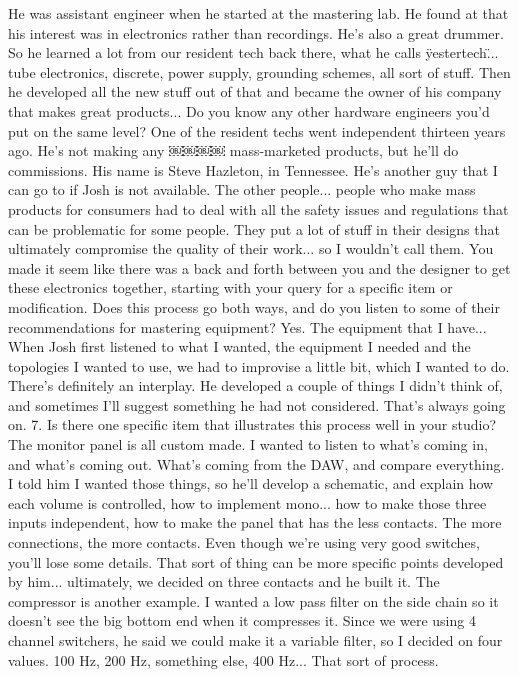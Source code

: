 He was assistant engineer when he started at the mastering lab. He found at that his interest was in electronics rather than recordings. He's also a great drummer. So he learned a lot from our resident tech back there, what he calls \"yestertech\"... tube electronics, discrete, power supply, grounding schemes, all sort of stuff. Then he developed all the new stuff out of that and became the owner of his company that makes great products...
Do you know any other hardware engineers you'd put on the same level?
One of the resident techs went independent thirteen years ago. He's not making any
￼￼￼￼
mass-marketed products, but he'll do commissions. His name is Steve Hazleton, in Tennessee. He's another guy that I can go to if Josh is not available. The other people... people who make mass products for consumers had to deal with all the safety issues and regulations that can be problematic for some people. They put a lot of stuff in their designs that ultimately compromise the quality of their work... so I wouldn't call them.
You made it seem like there was a back and forth between you and the designer to get these electronics together, starting with your query for a specific item or modification. Does this process go both ways, and do you listen to some of their recommendations for mastering equipment?
Yes. The equipment that I have... When Josh first listened to what I wanted, the equipment I needed and the topologies I wanted to use, we had to improvise a little bit, which I wanted to do. There's definitely an interplay. He developed a couple of things I didn't think of, and sometimes I'll suggest something he had not considered. That's always going on.
7. Is there one specific item that illustrates this process well in your studio?
The monitor panel is all custom made. I wanted to listen to what's coming in, and what's coming out. What's coming from the DAW, and compare everything. I told him I wanted those things, so he'll develop a schematic, and explain how each volume is controlled, how to implement mono... how to make those three inputs independent, how to make the panel that has the less contacts. The more connections, the more contacts. Even though we're using very good switches, you'll lose some details. That sort of thing can be more specific points developed by him... ultimately, we decided on three contacts and he built it.
The compressor is another example. I wanted a low pass filter on the side chain so it doesn't see the big bottom end when it compresses it. Since we were using 4 channel switchers, he said we could make it a variable filter, so I decided on four values. 100 Hz, 200 Hz, something else, 400 Hz... That sort of process.
